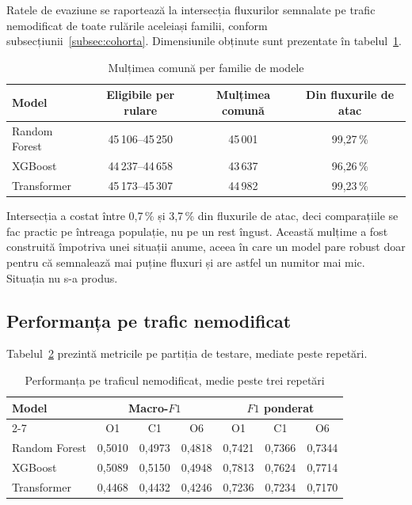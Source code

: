 Ratele de evaziune se raportează la intersecția fluxurilor semnalate pe trafic nemodificat de toate rulările aceleiași familii, conform subsecțiunii~\ref{subsec:cohorta}. Dimensiunile obținute sunt prezentate în tabelul~\ref{tab:o6-cohorte}.

\begin{table}[!ht]
    \caption{Mulțimea comună per familie de modele}
    \centering
    \begin{tabular}{|l|c|c|c|}
        \hline
        \textbf{Model} & \textbf{Eligibile per rulare} & \textbf{Mulțimea comună} & \textbf{Din fluxurile de atac} \\
        \hline
        Random Forest & 45\,106--45\,250 & 45\,001 & 99,27\,\% \\
        \hline
        XGBoost & 44\,237--44\,658 & 43\,637 & 96,26\,\% \\
        \hline
        Transformer & 45\,173--45\,307 & 44\,982 & 99,23\,\% \\
        \hline
    \end{tabular}
    \label{tab:o6-cohorte}
\end{table}

Intersecția a costat între 0,7\,\% și 3,7\,\% din fluxurile de atac, deci comparațiile se fac practic pe întreaga populație, nu pe un rest îngust. Această mulțime a fost construită împotriva unei situații anume, aceea în care un model pare robust doar pentru că semnalează mai puține fluxuri și are astfel un numitor mai mic. Situația nu s-a produs.

\subsection{Performanța pe trafic nemodificat}\label{subsec:o6-curat}

Tabelul~\ref{tab:o6-curat} prezintă metricile pe partiția de testare, mediate peste repetări.

\begin{table}[!ht]
    \caption{Performanța pe traficul nemodificat, medie peste trei repetări}
    \centering
    \begin{tabular}{|l|ccc|ccc|}
        \hline
        \textbf{Model} & \multicolumn{3}{c|}{\textbf{Macro-$F1$}}
                       & \multicolumn{3}{c|}{\textbf{$F1$ ponderat}} \\
        \cline{2-7}
                       & O1 & C1 & O6 & O1 & C1 & O6 \\
        \hline
        Random Forest       & 0,5010 & 0,4973 & 0,4818 & 0,7421 & 0,7366 & 0,7344 \\
        \hline
        XGBoost & 0,5089 & 0,5150 & 0,4948 & 0,7813 & 0,7624 & 0,7714 \\
        \hline
        Transformer       & 0,4468 & 0,4432 & 0,4246 & 0,7236 & 0,7234 & 0,7170 \\
        \hline
    \end{tabular}
    \label{tab:o6-curat}
\end{table}

